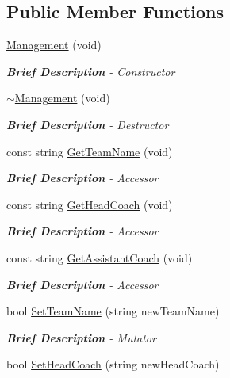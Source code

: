 \subsection*{Public Member Functions}
\begin{DoxyCompactItemize}
\item 
\hyperlink{class_management_a257178d02f42de0901c3841449ff8bb1}{Management} (void)
\begin{DoxyCompactList}\small\item\em {\bfseries Brief Description} -\/ Constructor \end{DoxyCompactList}\item 
\hyperlink{class_management_a5e386c7700d6dcc0c1728be3a551b918}{$\sim$\-Management} (void)
\begin{DoxyCompactList}\small\item\em {\bfseries Brief Description} -\/ Destructor \end{DoxyCompactList}\item 
const string \hyperlink{class_management_ad2d09a9d74ff2e5fbea54efcd76577a0}{Get\-Team\-Name} (void)
\begin{DoxyCompactList}\small\item\em {\bfseries Brief Description} -\/ Accessor \end{DoxyCompactList}\item 
const string \hyperlink{class_management_a6c6b73df06dc1c04f24d1c5acf94cad4}{Get\-Head\-Coach} (void)
\begin{DoxyCompactList}\small\item\em {\bfseries Brief Description} -\/ Accessor \end{DoxyCompactList}\item 
const string \hyperlink{class_management_a4f35b2aa96601b31e78aaf153300b41d}{Get\-Assistant\-Coach} (void)
\begin{DoxyCompactList}\small\item\em {\bfseries Brief Description} -\/ Accessor \end{DoxyCompactList}\item 
bool \hyperlink{class_management_af1e575b19ed269369eeef2de5719dec8}{Set\-Team\-Name} (string new\-Team\-Name)
\begin{DoxyCompactList}\small\item\em {\bfseries Brief Description} -\/ Mutator \end{DoxyCompactList}\item 
bool \hyperlink{class_management_a678515f513782f5516ac5b1c653a2456}{Set\-Head\-Coach} (string new\-Head\-Coach)

\end{DoxyCompactItemize}

